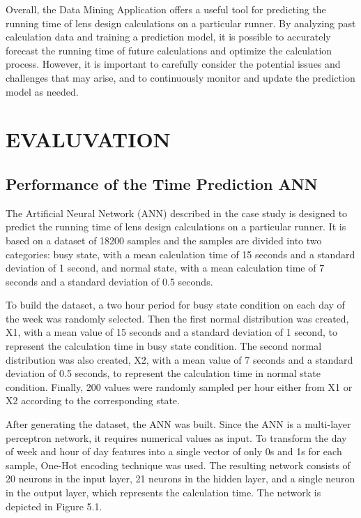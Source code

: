 \documentclass[10pt,a4paper]{report}
\begin{document}
\large\justify Overall, the Data Mining Application offers a useful tool for predicting the running time of lens design calculations on a particular runner. By analyzing past calculation data and training a prediction model, it is possible to accurately forecast the running time of future calculations and optimize the calculation process. However, it is important to carefully consider the potential issues and challenges that may arise, and to continuously monitor and update the prediction model as needed.

\newpage
\chapter{EVALUVATION}
\section{Performance of the Time Prediction ANN}
\large\justify The Artificial Neural Network (ANN) described in the case study is designed to predict the running time of lens design calculations on a particular runner. It is based on a dataset of 18200 samples and the samples are divided into two categories: busy state, with a mean calculation time of 15 seconds and a standard deviation of 1 second, and normal state, with a mean calculation time of 7 seconds and a standard deviation of 0.5 seconds.

\large\justify To build the dataset, a two hour period for busy state condition on each day of the week was randomly selected. Then the first normal distribution was created, X1, with a mean value of 15 seconds and a standard deviation of 1 second, to represent the calculation time in busy state condition. The second normal distribution was also created, X2, with a mean value of 7 seconds and a standard deviation of 0.5 seconds, to represent the calculation time in normal state condition. Finally, 200 values were randomly sampled per hour either from X1 or X2 according to the corresponding state.

\large\justify After generating the dataset, the ANN was built. Since the ANN is a multi-layer perceptron network, it requires numerical values as input. To transform the day of week and hour of day features into a single vector of only 0s and 1s for each sample,  One-Hot encoding technique was used. The resulting network consists of 20 neurons in the input layer, 21 neurons in the hidden layer, and a single neuron in the output layer, which represents the calculation time. The network is depicted in Figure 5.1.
\end{document}
